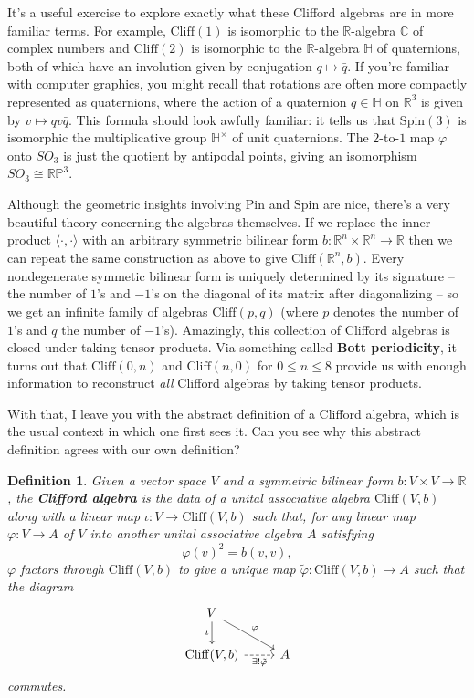 \documentclass{article}
\newcommand{\C}{\mathbb{C}}
\newcommand{\R}{\mathbb{R}}
\newcommand{\RP}{\mathbb{RP}}
\newtheorem{definition}{Definition}[subsection]
\begin{document}

It's a useful exercise to explore exactly what these Clifford algebras are in more familiar terms. For example, $\mathrm{Cliff}(1)$ is isomorphic to the $\R$-algebra $\C$ of complex numbers and $\mathrm{Cliff}(2)$ is isomorphic to the $\R$-algebra $\mathbb{H}$ of quaternions, both of which have an involution given by conjugation $q \mapsto \bar{q}$. If you're familiar with computer graphics, you might recall that rotations are often more compactly represented as quaternions, where the action of a quaternion $q \in \mathbb{H}$ on $\R^3$ is given by $v \mapsto qv\bar{q}$. This formula should look awfully familiar: it tells us that $\mathrm{Spin}(3)$ is isomorphic the multiplicative group $\mathbb{H}^{\times}$ of unit quaternions. The $2$-to-$1$ map $\varphi$ onto $SO_3$ is just the quotient by antipodal points, giving an isomorphism $SO_3 \cong \RP^3$.

Although the geometric insights involving $\mathrm{Pin}$ and $\mathrm{Spin}$ are nice, there's a very beautiful theory concerning the algebras themselves. If we replace the inner product $\langle \cdot,\cdot \rangle$ with an arbitrary symmetric bilinear form $b : \R^n \times \R^n \to \R$ then we can repeat the same construction as above to give $\mathrm{Cliff}(\R^n ,b)$. Every nondegenerate symmetic bilinear form is uniquely determined by its signature -- the number of $1$'s and $-1$'s on the diagonal of its matrix after diagonalizing -- so we get an infinite family of algebras $\mathrm{Cliff}(p,q)$ (where $p$ denotes the number of $1$'s and $q$ the number of $-1$'s). Amazingly, this collection of Clifford algebras is closed under taking tensor products. Via something called \textbf{Bott periodicity}, it turns out that $\mathrm{Cliff}(0,n)$ and $\mathrm{Cliff}(n,0)$ for $0 \leq n \leq 8$ provide us with enough information to reconstruct \emph{all} Clifford algebras by taking tensor products. 

With that, I leave you with the abstract definition of a Clifford algebra, which is the usual context in which one first sees it. Can you see why this abstract definition agrees with our own definition?

\vspace{0.5em}

\begin{definition}
Given a vector space $V$ and a symmetric bilinear form $b : V \times V \to \R$, the \textbf{Clifford algebra} is the data of a unital associative algebra $\mathrm{Cliff}(V,b)$ along with a linear map $\iota : V \to \mathrm{Cliff}(V,b)$ such that, for any linear map $\varphi : V \to A$ of $V$ into another unital associative algebra $A$ satisfying 
$$\varphi(v)^2 = b(v,v),$$
$\varphi$ factors through $\mathrm{Cliff}(V,b)$ to give a unique map $\tilde{\varphi} : \mathrm{Cliff}(V,b) \to A$ such that the diagram
$$\begin{tikzcd} 
V \ar[d, "\iota"'] \ar[dr, "\varphi"] \\
\mathrm{Cliff}(V,b) \ar[r, "\exists! \tilde{\varphi}"', dashed] & A
\end{tikzcd}$$
commutes.
\end{definition}
%
\end{document}

